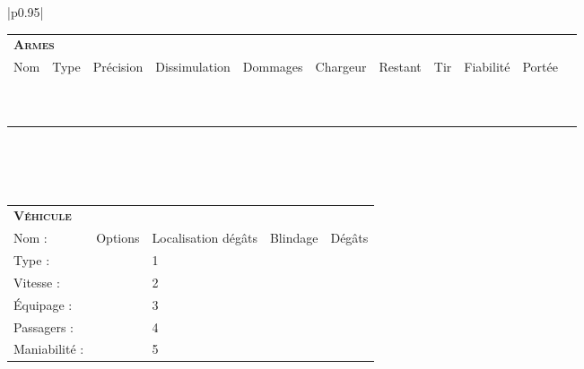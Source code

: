 \documentclass[11pt,twoside,a4paper]{article}
\def\CELblackTXTWhite{\cellcolor{black} \color{white}}
\begin{document}
\begin{tabular}{|p{}|}
	\begin{tabular}{|p{3.00cm}|p{1.00cm}|p{2.00cm}|p{2.00cm}|p{2.00cm}|p{1.00cm}|p{1.00cm}|p{1.00cm}|p{1.00cm}|p{1.00cm}|p{2.00cm}|}
		\multicolumn{11}{|p{18.90cm}|}{\CELblackTXTWhite \textsc{\textbf{\Large Armes}} }	\\
		Nom	&	Type	&	Pr{\'e}cision	&	Dissimulation	&	Dommages	&	Chargeur	&	Restant	&	Tir	&	Fiabilit{\'e}	&	Port{\'e}e	\\	\hline
			&			&					&					&				&				&			&		&					&				\\	\hline
			&			&					&					&				&				&			&		&					&				\\	\hline
			&			&					&					&				&				&			&		&					&				\\	\hline
			&			&					&					&				&				&			&		&					&				\\	\hline
			&			&					&					&				&				&			&		&					&				\\	\hline
			&			&					&					&				&				&			&		&					&				\\	\hline
			&			&					&					&				&				&			&		&					&				\\	\hline
			&			&					&					&				&				&			&		&					&				\\	\hline
			&			&					&					&				&				&			&		&					&				\\	\hline
			&			&					&					&				&				&			&		&					&				\\	\hline
	\end{tabular}	\\	\\	\\
	
	\begin{tabular}{|p{4.00cm}|p{4.00cm}|p{0.25cm}|p{1.75cm}|p{1.00cm}|p{1.00cm}|p{1.00cm}|p{1.00cm}|p{1.00cm}|}
		\multicolumn{9}{|p{18.90cm}|}{\CELblackTXTWhite \textsc{\textbf{\Large V{\'e}hicule}} }	\\
		Nom : 				&	Options		&	\multicolumn{3}{|p{3.00cm}|}{Localisation d{\'e}g{\^a}ts}		&	
												\multicolumn{2}{|p{2.00cm}|}{Blindage}							&	
												\multicolumn{2}{|p{2.00cm}|}{D{\'e}g{\^a}ts}					\\	\hline
		Type : 				&				&	1	&	\multicolumn{2}{|p{2.75cm}|}{ }	&	\multicolumn{2}{|p{2.00cm}|}{ }		&	\multicolumn{2}{|p{2.00cm}|}{}	\\	\hline
		Vitesse : 			&				&	2	&	\multicolumn{2}{|p{2.75cm}|}{ }	&	\multicolumn{2}{|p{2.00cm}|}{ }		&	\multicolumn{2}{|p{2.00cm}|}{}	\\	\hline
		{\'E}quipage : 		&				&	3	&	\multicolumn{2}{|p{2.75cm}|}{ }	&	\multicolumn{2}{|p{2.00cm}|}{ }		&	\multicolumn{2}{|p{2.00cm}|}{}	\\	\hline
		Passagers : 		&				&	4	&	\multicolumn{2}{|p{2.75cm}|}{ }	&	\multicolumn{2}{|p{2.00cm}|}{ }		&	\multicolumn{2}{|p{2.00cm}|}{}	\\	\hline
		Maniabilit{\'e} : 	&				&	5	&	\multicolumn{2}{|p{2.75cm}|}{ }	&	\multicolumn{2}{|p{2.00cm}|}{ }		&	\multicolumn{2}{|p{2.00cm}|}{}	\\	\hline
		

\end{tabular}
\end{tabular}
\end{document}
